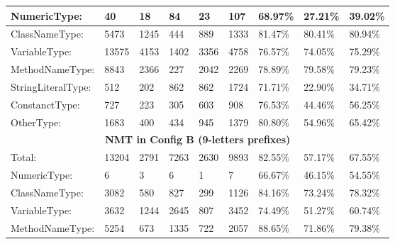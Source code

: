 \begin{table*}[]
\begin{tabular}{|l|l|l|l|l|l|l|l|l|}
NumericType:            & 40               & 18                 & 84           & 23           & 107          & 68.97\%            & 27.21\%         & 39.02\%     \\ \hline
ClassNameType:          & 5473             & 1245               & 444          & 889          & 1333         & 81.47\%            & 80.41\%         & 80.94\%     \\ \hline
VariableType:           & 13575            & 4153               & 1402         & 3356         & 4758         & 76.57\%            & 74.05\%         & 75.29\%     \\ \hline
MethodNameType:         & 8843             & 2366               & 227          & 2042         & 2269         & 78.89\%            & 79.58\%         & 79.23\%     \\ \hline
StringLiteralType:      & 512              & 202                & 862          & 862          & 1724         & 71.71\%            & 22.90\%         & 34.71\%     \\ \hline
ConstanctType:          & 727              & 223                & 305          & 603          & 908          & 76.53\%            & 44.46\%         & 56.25\%     \\ \hline
OtherType:              & 1683             & 400                & 434          & 945          & 1379         & 80.80\%            & 54.96\%         & 65.42\%     \\ \hline
\multicolumn{9}{|c|}{\textbf{NMT in Config B (9-letters prefixes)}}                                                                                               \\ \hline
Total:                  & 13204            & 2791               & 7263         & 2630         & 9893         & 82.55\%            & 57.17\%         & 67.55\%     \\ \hline
NumericType:            & 6                & 3                  & 6            & 1            & 7            & 66.67\%            & 46.15\%         & 54.55\%     \\ \hline
ClassNameType:          & 3082             & 580                & 827          & 299          & 1126         & 84.16\%            & 73.24\%         & 78.32\%     \\ \hline
VariableType:           & 3632             & 1244               & 2645         & 807          & 3452         & 74.49\%            & 51.27\%         & 60.74\%     \\ \hline
MethodNameType:         & 5254             & 673                & 1335         & 722          & 2057         & 88.65\%            & 71.86\%         & 79.38\%     \\ \hline

\end{tabular}
\end{table*}
